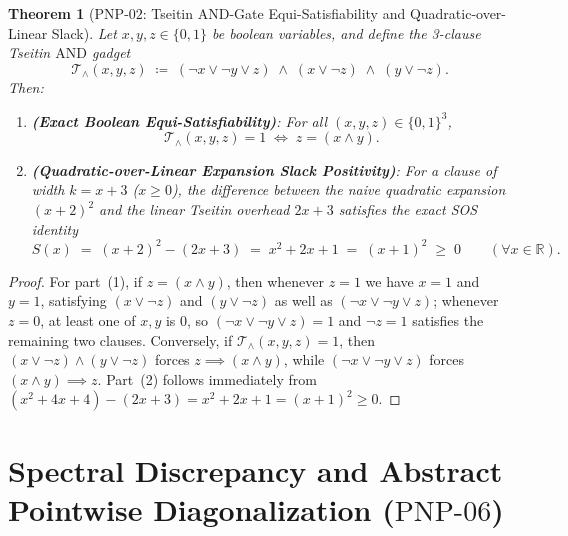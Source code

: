 \documentclass[11pt,a4paper]{article}
\theoremstyle{plain}
\newtheorem{theorem}{Theorem}[section]
\theoremstyle{definition}
\theoremstyle{remark}
\newcommand{\R}{\mathbb{R}}
\begin{document}
\begin{theorem}[$\mathrm{PNP\text{-}02}$: Tseitin $\mathrm{AND}$-Gate Equi-Satisfiability and Quadratic-over-Linear Slack]\label{thm:pnp02}
Let $x, y, z \in \{0, 1\}$ be boolean variables, and define the 3-clause Tseitin $\mathrm{AND}$ gadget
\begin{equation}
  \mathcal{T}_{\land}(x, y, z) \;\coloneqq\; (\neg x \lor \neg y \lor z) \;\land\; (x \lor \neg z) \;\land\; (y \lor \neg z).
\end{equation}
Then:
\begin{enumerate}
  \item \textbf{(Exact Boolean Equi-Satisfiability)}: For all $(x, y, z) \in \{0, 1\}^3$,
  \begin{equation}
    \mathcal{T}_{\land}(x, y, z) = 1 \;\Longleftrightarrow\; z = (x \land y).
  \end{equation}
  \item \textbf{(Quadratic-over-Linear Expansion Slack Positivity)}: For a clause of width $k = x + 3$ ($x \ge 0$), the difference between the naive quadratic expansion $(x + 2)^2$ and the linear Tseitin overhead $2x + 3$ satisfies the exact SOS identity
  \begin{equation}\label{eq:pnp02-sos}
    S(x) \;=\; (x + 2)^2 - (2x + 3) \;=\; x^2 + 2x + 1 \;=\; (x + 1)^2 \;\ge\; 0 \qquad (\forall x \in \R).
  \end{equation}
\end{enumerate}
\end{theorem}

\begin{proof}
For part~(1), if $z = (x \land y)$, then whenever $z = 1$ we have $x = 1$ and $y = 1$, satisfying $(x \lor \neg z)$ and $(y \lor \neg z)$ as well as $(\neg x \lor \neg y \lor z)$; whenever $z = 0$, at least one of $x, y$ is $0$, so $(\neg x \lor \neg y \lor z) = 1$ and $\neg z = 1$ satisfies the remaining two clauses. Conversely, if $\mathcal{T}_{\land}(x, y, z) = 1$, then $(x \lor \neg z) \land (y \lor \neg z)$ forces $z \implies (x \land y)$, while $(\neg x \lor \neg y \lor z)$ forces $(x \land y) \implies z$. Part~(2) follows immediately from $(x^2 + 4x + 4) - (2x + 3) = x^2 + 2x + 1 = (x + 1)^2 \ge 0$.
\end{proof}

\section{Spectral Discrepancy and Abstract Pointwise Diagonalization (\texorpdfstring{$\mathrm{PNP\text{-}06}$}{PNP-06})}
\end{document}
